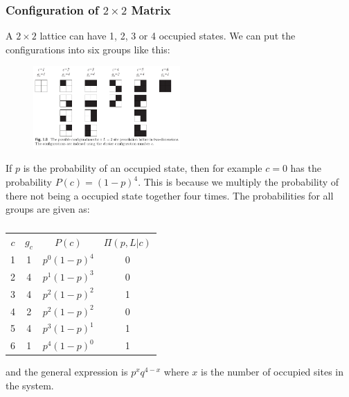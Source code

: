 \documentclass[11pt]{article}
\numberwithin{equation}{section}
\numberwithin{figure}{section}
\begin{document}
\subsubsection{Configuration of $2\times 2$ Matrix}

A $2\times2$ lattice can have 1, 2, 3 or 4 occupied states.
We can put the configurations into six groups like this:
\begin{figure}[h]
    \centering
    \includegraphics[width=0.50\textwidth]{figures/percolation-figures/2times2lattice-config.png}    
\end{figure}

If $p$ is the probability of an occupied state, then
for example $c=0$ has the probability $P(c) = {(1 - p)}^4$.
This is because we multiply the probability of there not
being a occupied state together four times.
The probabilities for all groups are given as:
\begin{table}[H]
    \centering
    \begin{tabu}{c c c c}
        \rowfont{\color{white}}
        $ c$ & $g_c$ & $P(c)$ & $\Pi(p, L|c)$\\
        1 & 1 & $p^0{(1-p)}^4$ & 0\\
        2 & 4 & $p^1{(1-p)}^3$ & 0\\
        3 & 4 & $p^2{(1-p)}^2$ & 1\\
        4 & 2 & $p^2{(1-p)}^2$ & 0\\
        5 & 4 & $p^3{(1-p)}^1$ & 1\\
        6 & 1 & $p^4{(1-p)}^0$ & 1\\
	\end{tabu}
			\caption{}\label{tab:perc-prob}
\end{table}

and the general expression is $p^x q^{4-x}$ where $x$ is the
number of occupied sites in the system.
\end{document}

